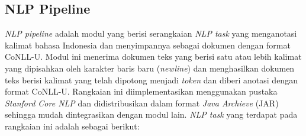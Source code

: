 \subsection{NLP Pipeline}

\textit{NLP pipeline} adalah modul yang berisi serangkaian \textit{NLP task} yang menganotasi kalimat bahasa Indonesia dan menyimpannya sebagai dokumen dengan format CoNLL-U. Modul ini menerima dokumen teks yang berisi satu atau lebih kalimat yang dipisahkan oleh karakter baris baru (\textit{newline}) dan menghasilkan dokumen teks berisi kalimat yang telah dipotong menjadi \textit{token} dan diberi anotasi dengan format CoNLL-U. Rangkaian ini diimplementasikan menggunakan pustaka \textit{Stanford Core NLP} dan didistribusikan dalam format \textit{Java Archieve} (JAR) sehingga mudah dintegrasikan dengan modul lain. \textit{NLP task} yang terdapat pada rangkaian ini adalah sebagai berikut:

